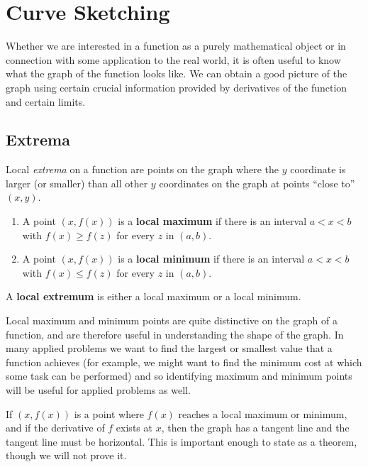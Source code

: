 \chapter{Curve Sketching}



Whether we are interested in a function as a purely mathematical
object or in connection with some application to the real world, it is
often useful to know what the graph of the function looks like. We can
obtain a good picture of the graph using certain crucial information
provided by derivatives of the function and certain limits.

\section{Extrema}

Local \textit{extrema} on a function are points on the graph where the
$y$ coordinate is larger (or smaller) than all other $y$ coordinates
on the graph at points ``close to'' $(x,y)$. 

\begin{definition}\hfil
\begin{enumerate}
\item A point $(x,f(x))$ is a \textbf{local maximum} if there is an interval $a<x<b$ with $f(x)\ge f(z)$ for
  every $z$ in $(a,b)$.
\item A point $(x,f(x))$ is a \textbf{local minimum} if there is an interval $a<x<b$ with $f(x)\le f(z)$ for
  every $z$ in $(a,b)$.
\end{enumerate}
A \textbf{local extremum} is either a local
maximum or a local minimum.
\end{definition}

Local maximum and minimum points are quite distinctive on the graph of
a function, and are therefore useful in understanding the shape of the
graph. In many applied problems we want to find the largest or
smallest value that a function achieves (for example, we might want
to find the minimum cost at which some task can be performed) and so
identifying maximum and minimum points will be useful for applied
problems as well.

If $(x,f(x))$ is a point where $f(x)$ reaches a local maximum or minimum,
and if the derivative of $f$ exists at $x$, then the graph has a
tangent line and the tangent line must be horizontal. This is
important enough to state as a theorem, though we will not prove it.

